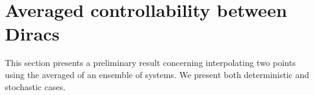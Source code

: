 \documentclass[12pt]{amsart}
\newcommand{\map}[3]{#1:#2 \rightarrow #3}
\renewcommand{\(}{\left (}
\renewcommand{\)}{\right )}
\numberwithin{equation}{section}
\begin{document}

\section{Averaged controllability between Diracs}\label{sec: Averaged controllability between Diracs}
This section presents a preliminary result concerning interpolating two points using the averaged of an ensemble of systems. We present both deterministic and stochastic cases.
\end{document}
